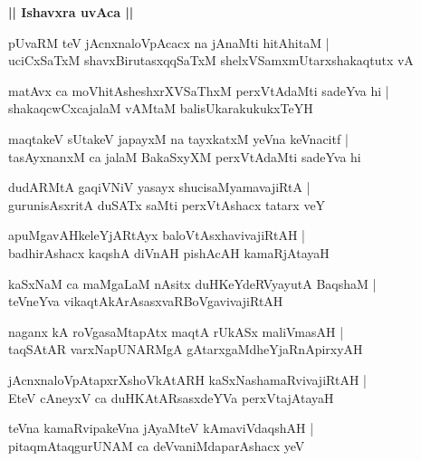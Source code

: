 \documentclass[twoside,12pt,openright]{book}
\newcounter{shloka}[chapter]
\def\uvaca#1{\centerline{{\large\textbf{#1}}}}
\begin{document}
\uvaca{|| Ishavxra uvAca ||}

\begin{shloka}%
pUvaRM teV jAcnxnaloVpAcacx na jAnaMti hitAhitaM |\\
uciCxSaTxM shavxBirutasxqqSaTxM shelxVSamxmUtarxshakaqtutx vA 
\end{shloka}

\begin{shloka}%
matAvx ca moVhitAsheshxrXVSaThxM perxVtAdaMti sadeYva hi |\\
shakaqcwCxcajalaM vAMtaM balisUkarakukukxTeYH 
\end{shloka}

\begin{shloka}%
maqtakeV sUtakeV japayxM na tayxkatxM yeVna keVnacitf |\\
tasAyxnanxM ca jalaM BakaSxyXM perxVtAdaMti sadeYva hi 
\end{shloka}

\begin{shloka}%
dudARMtA gaqiVNiV yasayx shucisaMyamavajiRtA |\\
gurunisAsxritA duSATx saMti perxVtAshacx tatarx veY 
\end{shloka}

\begin{shloka}%
apuMgavAHkeleYjARtAyx baloVtAsxhavivajiRtAH |\\
badhirAshacx kaqshA diVnAH pishAcAH kamaRjAtayaH
\end{shloka}

\begin{shloka}%
kaSxNaM ca maMgaLaM nAsitx duHKeYdeRVyayutA BaqshaM |\\
teVneYva vikaqtAkArAsasxvaRBoVgavivajiRtAH 
\end{shloka}

\begin{shloka}%
naganx kA roVgasaMtapAtx maqtA rUkASx maliVmasAH |\\
taqSAtAR varxNapUNARMgA gAtarxgaMdheYjaRnApirxyAH 
\end{shloka}

\begin{shloka}%
jAcnxnaloVpAtapxrXshoVkAtARH kaSxNashamaRvivajiRtAH |\\
EteV cAneyxV ca duHKAtARsasxdeYVa perxVtajAtayaH 
\end{shloka}

\begin{shloka}%
teVna kamaRvipakeVna jAyaMteV kAmaviVdaqshAH |\\
pitaqmAtaqgurUNAM ca deVvaniMdaparAshacx yeV 
\end{shloka}
\end{document}
